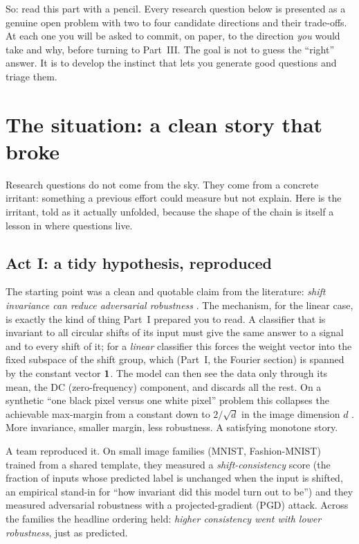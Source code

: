 So: read this part with a pencil. Every research question below is presented as a genuine open
problem with two to four candidate directions and their trade-offs. At each one you will be asked to
commit, on paper, to the direction \emph{you} would take and why, before turning to Part~III. The
goal is not to guess the ``right'' answer. It is to develop the instinct that lets you generate good
questions and triage them.

\section{The situation: a clean story that broke}
\label{sec:p2-situation}

Research questions do not come from the sky. They come from a concrete irritant: something a
previous effort could measure but not explain. Here is the irritant, told as it actually unfolded,
because the shape of the chain is itself a lesson in where questions live.

\subsection{Act I: a tidy hypothesis, reproduced}
\label{sub:p2-act1}

The starting point was a clean and quotable claim from the literature: \emph{shift invariance can
reduce adversarial robustness} \citep{ge2021shift}. The mechanism, for the linear case, is exactly
the kind of thing Part~I prepared you to read. A classifier that is invariant to all circular
shifts of its input must give the same answer to a signal and to every shift of it; for a
\emph{linear} classifier this forces the weight vector into the fixed subspace of the shift group,
which (Part~I, the Fourier section) is spanned by the constant vector $\mathbf 1$. The model can then see
the data only through its mean, the DC (zero-frequency) component, and discards all the rest. On a
synthetic ``one black pixel versus one white pixel'' problem this collapses the achievable max-margin
from a constant down to $2/\sqrt{d}$ in the image dimension $d$ \citep{ge2021shift}. More invariance,
smaller margin, less robustness. A satisfying monotone story.

A team reproduced it. On small image families (MNIST, Fashion-MNIST) trained from a shared template,
they measured a \emph{shift-consistency} score (the fraction of inputs whose predicted label is
unchanged when the input is shifted, an empirical stand-in for ``how invariant did this model turn
out to be'') and they measured adversarial robustness with a projected-gradient (PGD) attack.
Across the families the headline ordering held: \emph{higher consistency went with lower robustness},
just as predicted.


